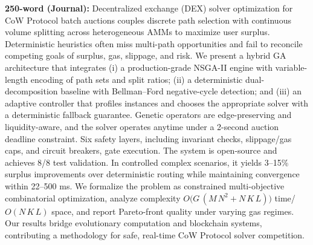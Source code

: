 \documentclass[11pt]{article}
\newcommand{\1}{\mathbf{1}}  %
\begin{document}
\vspace{0.5em}
\textbf{250-word (Journal):} Decentralized exchange (DEX) solver optimization for CoW Protocol batch auctions couples discrete path selection with continuous volume splitting across heterogeneous AMMs to maximize user surplus. Deterministic heuristics often miss multi-path opportunities and fail to reconcile competing goals of surplus, gas, slippage, and risk. We present a hybrid GA architecture that integrates (i) a production-grade NSGA-II engine with variable-length encoding of path sets and split ratios; (ii) a deterministic dual-decomposition baseline with Bellman--Ford negative-cycle detection; and (iii) an adaptive controller that profiles instances and chooses the appropriate solver with a deterministic fallback guarantee. Genetic operators are edge-preserving and liquidity-aware, and the solver operates anytime under a 2-second auction deadline constraint. Six safety layers, including invariant checks, slippage/gas caps, and circuit breakers, gate execution. The system is open-source and achieves 8/8 test validation. In controlled complex scenarios, it yields 3--15\% surplus improvements over deterministic routing while maintaining convergence within 22--500 ms. We formalize the problem as constrained multi-objective combinatorial optimization, analyze complexity $O\big(G\,(M\,N^2 + N\,K\,L)\big)$ time/$O(N\,K\,L)$ space, and report Pareto-front quality under varying gas regimes. Our results bridge evolutionary computation and blockchain systems, contributing a methodology for safe, real-time CoW Protocol solver competition.
\end{document}
